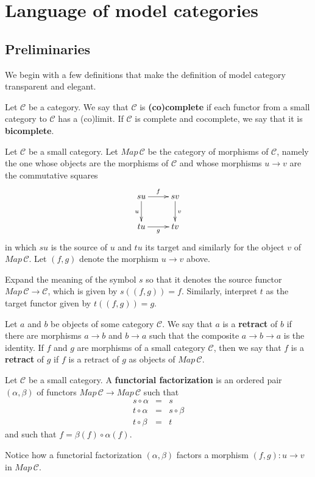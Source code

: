
\section{Language of model categories}
\label{sec:language}

\subsection{Preliminaries}

We begin with a few definitions that make the definition of model category transparent and elegant.
\begin{definition}
Let $\mathscr{C}$ be a category. We say that $\mathscr{C}$ is \textbf{(co)complete} if each functor from a small category to $\mathscr{C}$ has a (co)limit. If $\mathscr{C}$ is complete and cocomplete, we say that it is \textbf{bicomplete}.
\end{definition}
\begin{definition}
Let $\mathscr{C}$ be a small category. Let $Map\, \mathscr{C}$ be the category of morphisms of $\mathscr{C}$, namely the one whose objects are the morphisms of $\mathscr{C}$ and whose morphisms $u\to v$ are the commutative squares
\begin{displaymath}
\xymatrix{
su \ar[d]_u \ar[r]^f & sv \ar[d]^v \\
tu \ar[r]_g & tv
}
\end{displaymath}
in which $su$ is the source of $u$ and $tu$ its target and similarly for the object $v$ of $Map\, \mathscr{C}$. Let $(f,g)$ denote the morphism $u\to v$ above.

Expand the meaning of the symbol $s$ so that it denotes the source functor $Map\, \mathscr{C} \to \mathscr{C}$, which is given by $s((f,g))=f$. Similarly, interpret $t$ as the target functor given by $t((f,g))=g$.
\end{definition}
\begin{definition}
Let $a$ and $b$ be objects of some category $\mathscr{C}$. We say that $a$ is a \textbf{retract} of $b$ if there are morphisms $a\to b$ and $b\to a$ such that the composite $a\to b\to a$ is the identity. If $f$ and $g$ are morphisms of a small category $\mathscr{C}$, then we say that $f$ is a \textbf{retract} of $g$ if $f$ is a retract of $g$ as objects of $Map\, \mathscr{C}$.
\end{definition}
\begin{definition}\label{def:functorial_factorization}
Let $\mathscr{C}$ be a small category. A \textbf{functorial factorization} is an ordered pair $(\alpha ,\beta )$ of functors $Map\, \mathscr{C} \to Map\, \mathscr{C}$ such that
\begin{displaymath}
\begin{array}{rcl}
s\circ \alpha & = & s \\
t\circ \alpha & = & s\circ \beta \\
t\circ \beta & = & t
\end{array}
\end{displaymath}
and such that $f=\beta (f)\circ \alpha (f)$.
\end{definition}
\noindent Notice how a functorial factorization $(\alpha ,\beta )$ factors a morphism $(f,g):u\to v$ in $Map\, \mathscr{C}$.

